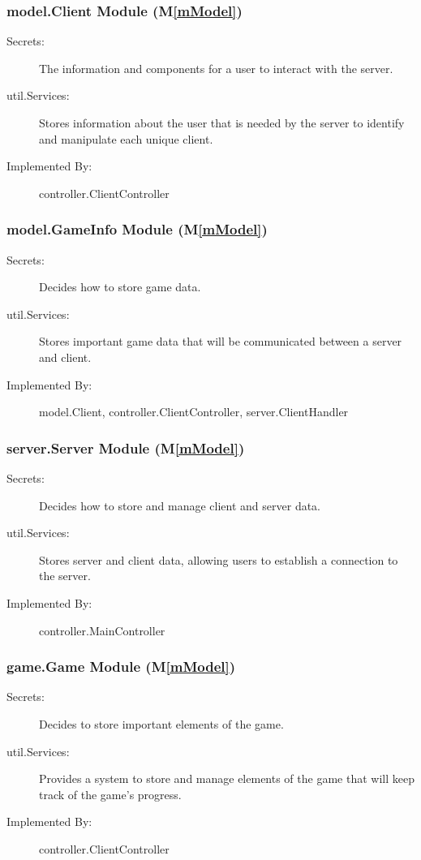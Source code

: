 \documentclass[12pt, titlepage]{article}
\newcommand{\mref}[1]{M\ref{#1}}
\begin{document}
\subsubsection{ model.Client Module (\mref{mModel})}
    \begin{description}
    \item[Secrets:] The information and components for a user to interact with the server.
    \item[util.Services:] Stores information about the user that is needed by the server to identify and manipulate each unique client.
    \item[Implemented By:] controller.ClientController
    \end{description}

\subsubsection{ model.GameInfo Module (\mref{mModel})}
    \begin{description}
    \item[Secrets:] Decides how to store game data.
    \item[util.Services:] Stores important game data that will be communicated between a server and client.
    \item[Implemented By:] model.Client, controller.ClientController, server.ClientHandler
    \end{description}

\subsubsection{ server.Server Module (\mref{mModel})}
    \begin{description}
    \item[Secrets:] Decides how to store and manage client and server data.
    \item[util.Services:] Stores server and client data, allowing users to establish a connection to the server.
    \item[Implemented By:] controller.MainController
    \end{description}

\subsubsection{ game.Game Module (\mref{mModel})}
    \begin{description}
    \item[Secrets:] Decides to store important elements of the game.
    \item[util.Services:] Provides a system to store and manage elements of the game that will keep track of the game's progress.
    \item[Implemented By:] controller.ClientController
    \end{description}
\end{document}
